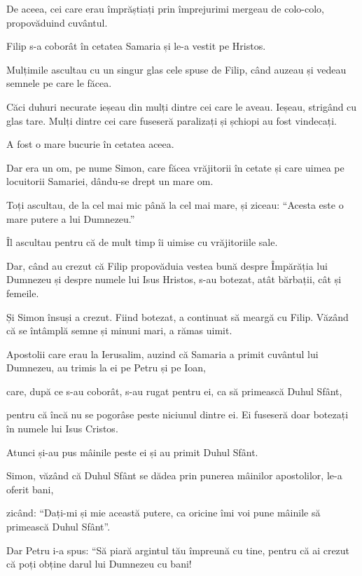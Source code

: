 {De aceea, cei care erau împrăștiați prin împrejurimi mergeau de colo-colo, propovăduind cuvântul.

Filip s-a coborât în cetatea Samaria și le-a vestit pe Hristos.

Mulțimile ascultau cu un singur glas cele spuse de Filip, când auzeau și vedeau semnele pe care le făcea.

Căci duhuri necurate ieșeau din mulți dintre cei care le aveau. Ieșeau, strigând cu glas tare. Mulți dintre cei care fuseseră paralizați și șchiopi au fost vindecați.

A fost o mare bucurie în cetatea aceea.


\par }{\PP {}Dar era un om, pe nume Simon, care făcea vrăjitorii în cetate și care uimea pe locuitorii Samariei, dându-se drept un mare om.

Toți ascultau, de la cel mai mic până la cel mai mare, și ziceau: “Acesta este o mare putere a lui Dumnezeu.”

Îl ascultau pentru că de mult timp îi uimise cu vrăjitoriile sale.

Dar, când au crezut că Filip propovăduia vestea bună despre Împărăția lui Dumnezeu și despre numele lui Isus Hristos, s-au botezat, atât bărbații, cât și femeile.

Și Simon însuși a crezut. Fiind botezat, a continuat să meargă cu Filip. Văzând că se întâmplă semne și minuni mari, a rămas uimit.


\par }{\PP {}Apostolii care erau la Ierusalim, auzind că Samaria a primit cuvântul lui Dumnezeu, au trimis la ei pe Petru și pe Ioan,

care, după ce s-au coborât, s-au rugat pentru ei, ca să primească Duhul Sfânt,

pentru că încă nu se pogorâse peste niciunul dintre ei. Ei fuseseră doar botezați în numele lui Isus Cristos.

Atunci și-au pus mâinile peste ei și au primit Duhul Sfânt.

Simon, văzând că Duhul Sfânt se dădea prin punerea mâinilor apostolilor, le-a oferit bani,

zicând: “Dați-mi și mie această putere, ca oricine îmi voi pune mâinile să primească Duhul Sfânt”.

Dar Petru i-a spus: “Să piară argintul tău împreună cu tine, pentru că ai crezut că poți obține darul lui Dumnezeu cu bani!

}
